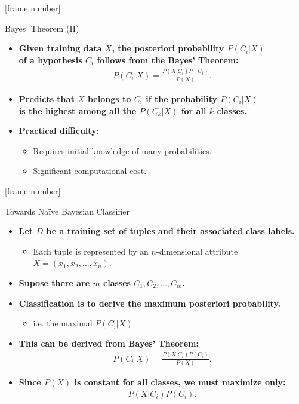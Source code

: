 \documentclass[aspectratio=169,t,table]{beamer}
\begin{document}
  {
    [frame number]
    \begin{frame}{Bayes' Theorem (II)}
        \begin{itemize}
          \item \textbf{Given training data $X$, the posteriori probability $P(C_i|X)$\\
           of a hypothesis $C_i$ follows from the Bayes' Theorem:}
           \begin{align}
             P(C_i|X) = \frac{P(X|C_i)P(C_i)}{P(X)}.
           \end{align}
          \item \textbf{Predicts that $X$ belongs to $C_i$ if the probability $P(C_i|X)$\\
           is {\color{airforceblue}the highest} among all the $P(C_k|X)$ for all $k$ classes.}
           \item \textbf{Practical difficulty:}
           \begin{itemize}
             \item Requires initial knowledge of many probabilities.
             \item Significant computational cost.
           \end{itemize}
        \end{itemize}
    \end{frame}
  }

  {
    [frame number]
    \begin{frame}{Towards Naïve Bayesian Classifier}
        \begin{itemize}
          \item \textbf{Let $D$ be a training set of tuples and their associated class labels.}
          \begin{itemize}
            \item Each tuple is represented by an $n$-dimensional attribute $X = (x_1,x_2,\ldots,x_n)$.
          \end{itemize}
          \item \textbf{Supose there are $m$ classes $C_1,C_2, \ldots, C_m$.}
          \item \textbf{Classification is to derive the {\color{airforceblue}maximum posteriori probability}.}
          \begin{itemize}
            \item i.e. the maximal $P(C_i|X)$.
          \end{itemize}
          \item \textbf{This can be derived from Bayes' Theorem:}
          \begin{align}
            P(C_i|X) = \frac{P(X|C_i)P(C_i)}{P(X)}.
          \end{align}
          \item \textbf{Since $P(X)$ is constant for all classes, we must maximize only:}
          \begin{align}
            P(X|C_i)P(C_i).
          \end{align}
        \end{itemize}
    \end{frame}
  }
\end{document}
